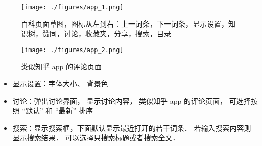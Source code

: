 
\begin{figure}[ht]
\centering
\texttt{[image: ./figures/app\_1.png]}
\caption{百科页面草图，图标从左到右：上一词条，下一词条，显示设置，知识树，赞同，讨论，收藏夹，分享，搜索，目录} \label{app_fig1}
\end{figure}

\begin{figure}[ht]
\centering
\texttt{[image: ./figures/app\_2.png]}
\caption{类似知乎 app 的评论页面} \label{app_fig2}
\end{figure}

\begin{itemize}
\item 显示设置：字体大小、 背景色
\item 讨论：弹出讨论界面， 显示讨论内容， 类似知乎 app 的评论页面， 可选择按照 “默认” 和 “最新” 排序
\item 搜索：显示搜索框，下面默认显示最近打开的若干词条． 若输入搜索内容则显示搜索结果． 可以选择只搜索标题或者搜索全文．
\end{itemize}
